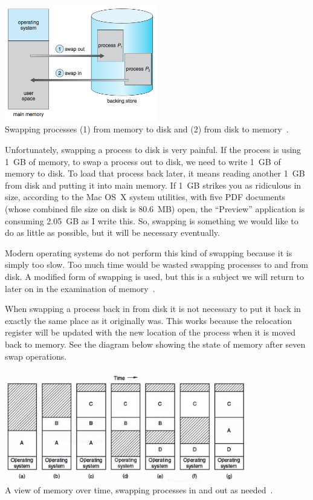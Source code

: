 \begin{center}
\includegraphics[width=0.5\textwidth]{images/swapping1.png}\\
Swapping processes (1) from memory to disk and (2) from disk to memory~\cite{osc}.
\end{center}

Unfortunately, swapping a process to disk is very painful. If the process is using 1~GB of memory, to swap a process out to disk, we need to write 1~GB of memory to disk. To load that process back later, it means reading another 1~GB from disk and putting it into main memory. If 1~GB strikes you as ridiculous in size, according to the Mac OS~X system utilities, with five PDF documents (whose combined file size on disk is 80.6~MB) open, the ``Preview'' application is consuming 2.05~GB as I write this. So, swapping is something we would like to do as little as possible, but it will be necessary eventually. 

Modern operating systems do not perform this kind of swapping because it is simply too slow. Too much time would be wasted swapping processes to and from disk. A modified form of swapping is used, but this is a subject we will return to later on in the examination of memory~\cite{osc}.

When swapping a process back in from disk it is not necessary to put it back in exactly the same place as it originally was. This works because the relocation register will be updated with the new location of the process when it is moved back to memory. See the diagram below showing the state of memory after seven swap operations.

\begin{center}
\includegraphics[width=0.8\textwidth]{images/swapping2.png}\\
A view of memory over time, swapping processes in and out as needed~\cite{mos}.
\end{center}

